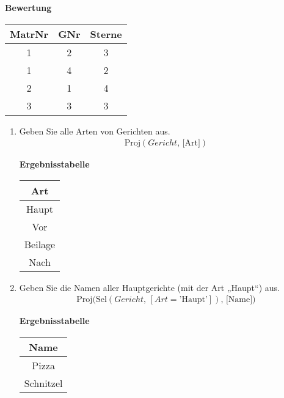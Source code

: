 \begin{table}[H]
\begin{minipage}[t]{0.3\textwidth}
        \centering
        \textbf{Bewertung} \\ [3pt]
        \begin{tabular}{|c|c|c|}
            \hline
            \textbf{MatrNr} & \textbf{GNr} & \textbf{Sterne} \\
            \hline
            1 & 2    & 3 \\
            1 & 4    & 2 \\
            2 & 1    & 4\\
            3 & 3    & 3 \\
            \hline
        \end{tabular}
    \end{minipage}
\end{table}

\begin{enumerate}
    \item Geben Sie alle Arten von Gerichten aus.
        \begin{align*}
            \text{Proj}(Gericht,\, \text{[Art]})
        \end{align*}

        \begin{table}[H]
            \centering
            \textbf{Ergebnisstabelle} \\ [3pt]
            \begin{tabular}{|c|}
                \hline
                \textbf{Art}\\
                \hline
                Haupt \\
                Vor \\
                Beilage \\
                Nach\\
                \hline  
            \end{tabular}
        \end{table}

    \item Geben Sie die Namen aller Hauptgerichte (mit der Art „Haupt“) aus.
        \begin{align*}
            \text{Proj}\bigl(
            \text{Sel}(Gericht,\,[Art=\text{'Haupt'}]),\, \text{[Name]}
            \bigr)
        \end{align*}

        \begin{table}[H]
            \centering
            \textbf{Ergebnisstabelle} \\ [3pt]
            \begin{tabular}{|c|}
                \hline
                \textbf{Name}\\
                \hline
                Pizza \\
                Schnitzel \\
                \hline  
            \end{tabular}
        \end{table}


\end{enumerate}
